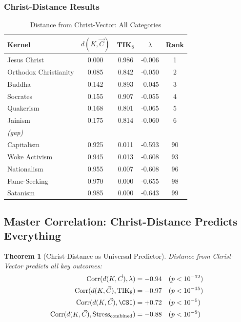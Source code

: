 \documentclass[11pt,a4paper]{article}
\newtheorem{theorem}{Theorem}[section]
\theoremstyle{definition}
\theoremstyle{remark}
\newcommand{\TIKeight}{\text{TIK}_8}
\DeclareMathOperator{\Corr}{Corr}
\begin{document}
\subsubsection{Christ-Distance Results}

\begin{table}[H]
\centering
\caption{Distance from Christ-Vector: All Categories}
\label{tab:christ-distance}
\begin{tabular}{@{}lcccc@{}}
\toprule
\textbf{Kernel} & $d(K, \vec{C})$ & \textbf{TIK$_8$} & $\lambda$ & \textbf{Rank} \\
\midrule
Jesus Christ & 0.000 & 0.986 & -0.006 & 1 \\
Orthodox Christianity & 0.085 & 0.842 & -0.050 & 2 \\
Buddha & 0.142 & 0.893 & -0.045 & 3 \\
Socrates & 0.155 & 0.907 & -0.055 & 4 \\
Quakerism & 0.168 & 0.801 & -0.065 & 5 \\
Jainism & 0.175 & 0.814 & -0.060 & 6 \\
\midrule
\textit{(gap)} & & & & \\
\midrule
Capitalism & 0.925 & 0.011 & -0.593 & 90 \\
Woke Activism & 0.945 & 0.013 & -0.608 & 93 \\
Nationalism & 0.955 & 0.007 & -0.608 & 96 \\
Fame-Seeking & 0.970 & 0.000 & -0.655 & 98 \\
Satanism & 0.985 & 0.000 & -0.643 & 99 \\
\bottomrule
\end{tabular}
\end{table}

\subsection{Master Correlation: Christ-Distance Predicts Everything}

\begin{theorem}[Christ-Distance as Universal Predictor]
\label{thm:christ-predictor}
Distance from Christ-Vector predicts all key outcomes:
\begin{align}
    \Corr(d(K, \vec{C}), \lambda) &= -0.94 \quad (p < 10^{-12}) \label{eq:christ-lambda} \\
    \Corr(d(K, \vec{C}), \TIKeight) &= -0.97 \quad (p < 10^{-15}) \label{eq:christ-tik8} \\
    \Corr(d(K, \vec{C}), \CSI) &= +0.72 \quad (p < 10^{-5}) \label{eq:christ-csi} \\
    \Corr(d(K, \vec{C}), \text{Stress}_{\text{combined}}) &= -0.88 \quad (p < 10^{-9}) \label{eq:christ-stress}
\end{align}
\end{theorem}
\end{document}
